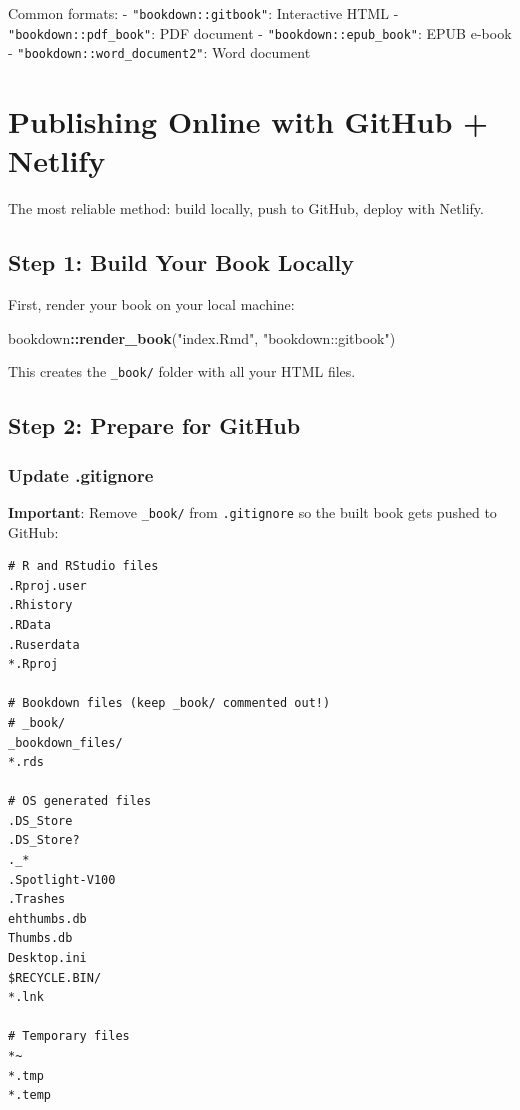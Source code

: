\documentclass[
]{book}
\newenvironment{Shaded}{\begin{snugshade}}{\end{snugshade}}
\newcommand{\FunctionTok}[1]{\textcolor[rgb]{0.13,0.29,0.53}{\textbf{#1}}}
\newcommand{\NormalTok}[1]{#1}
\newcommand{\SpecialCharTok}[1]{\textcolor[rgb]{0.81,0.36,0.00}{\textbf{#1}}}
\newcommand{\StringTok}[1]{\textcolor[rgb]{0.31,0.60,0.02}{#1}}
\begin{document}
Common formats:
- \texttt{"bookdown::gitbook"}: Interactive HTML
- \texttt{"bookdown::pdf\_book"}: PDF document
- \texttt{"bookdown::epub\_book"}: EPUB e-book
- \texttt{"bookdown::word\_document2"}: Word document

\section{Publishing Online with GitHub + Netlify}\label{publishing-online-with-github-netlify}

The most reliable method: build locally, push to GitHub, deploy with Netlify.

\subsection{Step 1: Build Your Book Locally}\label{step-1-build-your-book-locally}

First, render your book on your local machine:

\begin{Shaded}
\begin{Highlighting}[]
\NormalTok{bookdown}\SpecialCharTok{::}\FunctionTok{render\_book}\NormalTok{(}\StringTok{"index.Rmd"}\NormalTok{, }\StringTok{"bookdown::gitbook"}\NormalTok{)}
\end{Highlighting}
\end{Shaded}

This creates the \texttt{\_book/} folder with all your HTML files.

\subsection{Step 2: Prepare for GitHub}\label{step-2-prepare-for-github}

\subsubsection{Update .gitignore}\label{update-.gitignore}

\textbf{Important}: Remove \texttt{\_book/} from \texttt{.gitignore} so the built book gets pushed to GitHub:

\begin{verbatim}
# R and RStudio files
.Rproj.user
.Rhistory
.RData
.Ruserdata
*.Rproj

# Bookdown files (keep _book/ commented out!)
# _book/
_bookdown_files/
*.rds

# OS generated files
.DS_Store
.DS_Store?
._*
.Spotlight-V100
.Trashes
ehthumbs.db
Thumbs.db
Desktop.ini
$RECYCLE.BIN/
*.lnk

# Temporary files
*~
*.tmp
*.temp
\end{verbatim}
\end{document}
